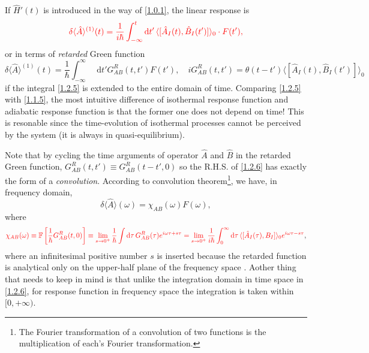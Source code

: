 \documentclass[10pt,nofootinbib,letterpaper]{revtex4}
\newcommand*\dd{\mathop{}\!\mathrm{d}}
\newcounter{Note}[section]
\newenvironment{Note}[1][]{{\par\normalfont\bfseries \underline{Note~\stepcounter{Note}\arabic{Note}.}~#1~~}}{\par}
\begin{document}
		If $\hat H'(t)$ is introduced in the way of \eqref{1.0.1}, the linear response is
		\begin{equation}\label{1.2.5}
			{\color{red}\delta \langle\hat A\rangle^{(1)}(t)=\dfrac{1}{i\hbar}\int_{-\infty}^t\dd t'\,\langle[\hat A_I(t),\hat B_I(t')]\rangle_0\cdot F(t'),}
		\end{equation}
		or in terms of \emph{retarded} Green function
		\begin{equation}\label{1.2.6}
			\delta \langle\hat A\rangle^{(1)}(t)=\dfrac{1}{\hbar}\int_{-\infty}^\infty\dd t' G_{AB}^R(t,t')F(t'),\quad iG_{AB}^R(t,t')=\theta(t-t')\langle[\hat A_I(t),\hat B_I(t')]\rangle_0
		\end{equation}
		if the integral \eqref{1.2.5} is extended to the entire domain of time. 
		\begin{Note}
			Comparing \eqref{1.2.5} with \eqref{1.1.5}, the most intuitive difference of isothermal response function and adiabatic response function is that the former one does not depend on time! This is resonable since the time-evolution of isothermal processes cannot be perceived by the system (it is always in quasi-equilibrium). 
		\end{Note}
		\hfill\par
		Note that by cycling the time arguments of operator $\hat A$ and $\hat B$ in the retarded Green function, $G_{AB}^R(t,t')\equiv G^R_{AB}(t-t',0)$ so the R.H.S. of \eqref{1.2.6} has exactly the form of a \emph{convolution}. According to convolution theorem\footnote{The Fourier transformation of a convolution of two functions is the multiplication of each's Fourier transformation.}, we have, in frequency domain,
		\begin{equation}\label{1.2.7}
			\delta\langle\hat A\rangle(\omega)=\chi_{AB}(\omega)F(\omega),
		\end{equation}
		where
		\begin{equation}\label{1.2.8}
			 {\color{red}\chi_{AB}(\omega)\equiv\mathbb{F}\left[\dfrac{1}{\hbar}G_{AB}^R(t,0)\right]\equiv\lim_{s \rightarrow0^+}\dfrac{1}{\hbar}\int\dd\tau\,G^R_{AB}(\tau)e^{i\omega\tau+s\tau}=\lim_{s\rightarrow0^+}\dfrac{1}{i\hbar}\int_0^\infty\dd\tau\,\langle[\hat A_I(\tau),B_I]\rangle_0 e^{i\omega\tau-s\tau}},
		\end{equation}
		where an infinitesimal positive number $s$ is inserted because the retarded function is analytical only on the upper-half plane of the frequency space \cite{abrikosov2012methods}. Aother thing that needs to keep in mind is that unlike the integration domain in time space in \eqref{1.2.6}, for response function in frequency space the integration is taken within $[0,+\infty)$.\par
\end{document}
